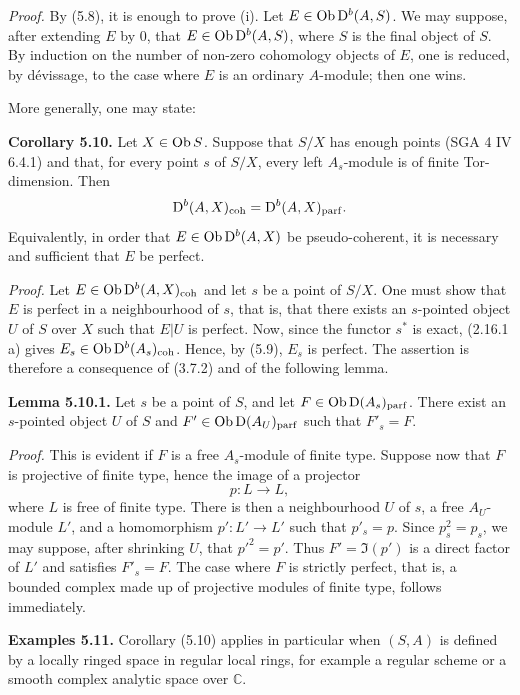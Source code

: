 \documentclass[11pt]{article}
\begin{document}
\emph{Proof.} By (5.8), it is enough to prove (i). Let \(E\in\operatorname{Ob}\mathrm D^b(A,S)\). We may suppose, after extending \(E\) by \(0\), that \(E\in\operatorname{Ob}\mathrm D^b(A,S)\), where \(S\) is the final object of \(S\). By induction on the number of non-zero cohomology objects of \(E\), one is reduced, by dévissage, to the case where \(E\) is an ordinary \(A\)-module; then one wins.

More generally, one may state:

\textbf{Corollary 5.10.} Let \(X\in\operatorname{Ob} S\). Suppose that \(S/X\) has enough points (SGA 4 IV 6.4.1) and that, for every point \(s\) of \(S/X\), every left \(A_s\)-module is of finite Tor-dimension. Then
\[
  \mathrm D^b(A,X)_{\mathrm{coh}}=\mathrm D^b(A,X)_{\mathrm{parf}}.
\]
Equivalently, in order that \(E\in\operatorname{Ob}\mathrm D^b(A,X)\) be pseudo-coherent, it is necessary and sufficient that \(E\) be perfect.

\emph{Proof.} Let \(E\in\operatorname{Ob}\mathrm D^b(A,X)_{\mathrm{coh}}\) and let \(s\) be a point of \(S/X\). One must show that \(E\) is perfect in a neighbourhood of \(s\), that is, that there exists an \(s\)-pointed object \(U\) of \(S\) over \(X\) such that \(E|U\) is perfect. Now, since the functor \(s^*\) is exact, (2.16.1 a) gives \(E_s\in\operatorname{Ob}\mathrm D^b(A_s)_{\mathrm{coh}}\). Hence, by (5.9), \(E_s\) is perfect. The assertion is therefore a consequence of (3.7.2) and of the following lemma.

\textbf{Lemma 5.10.1.} Let \(s\) be a point of \(S\), and let \(F\in\operatorname{Ob}\mathrm D(A_s)_{\mathrm{parf}}\). There exist an \(s\)-pointed object \(U\) of \(S\) and \(F'\in\operatorname{Ob}\mathrm D(A_U)_{\mathrm{parf}}\) such that \(F'_s=F\).

\emph{Proof.} This is evident if \(F\) is a free \(A_s\)-module of finite type. Suppose now that \(F\) is projective of finite type, hence the image of a projector
\[
  p:L\longrightarrow L,
\]
where \(L\) is free of finite type. There is then a neighbourhood \(U\) of \(s\), a free \(A_U\)-module \(L'\), and a homomorphism \(p':L'\to L'\) such that \(p'_s=p\). Since \(p_s^2=p_s\), we may suppose, after shrinking \(U\), that \(p'^2=p'\). Thus \(F'=\Im(p')\) is a direct factor of \(L'\) and satisfies \(F'_s=F\). The case where \(F\) is strictly perfect, that is, a bounded complex made up of projective modules of finite type, follows immediately.

\textbf{Examples 5.11.} Corollary (5.10) applies in particular when \((S,A)\) is defined by a locally ringed space in regular local rings, for example a regular scheme or a smooth complex analytic space over \(\mathbb C\).
\end{document}
